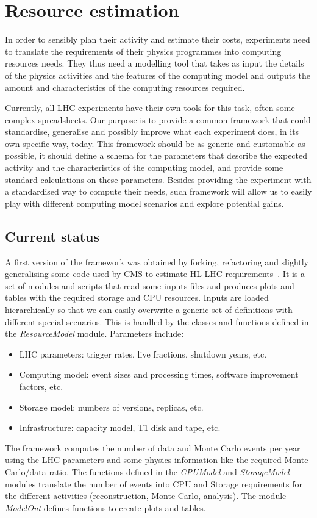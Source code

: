 \section{Resource estimation}
In order to sensibly plan their activity and estimate their costs,
experiments need to translate the requirements of their physics
programmes into computing resources needs. They thus need a modelling
tool that takes as input the details of the physics activities and the
features of the computing model and outputs the amount and
characteristics of the computing resources required.

Currently, all LHC experiments have their own tools for this task,
often some complex spreadsheets. Our purpose is to provide a common
framework that could standardise, generalise and possibly improve what
each experiment does, in its own specific way, today. This framework
should be as generic and customable as possible, it should define a
schema for the parameters that describe the expected activity and the
characteristics of the computing model, and provide some standard
calculations on these parameters.  Besides providing the experiment
with a standardised way to compute their needs, such framework will
allow us to easily play with different computing model scenarios and
explore potential gains.

\subsection{Current status}
A first version of the framework \cite{ourresmodel} was obtained by
forking, refactoring and slightly generalising some code
used by CMS to estimate HL-LHC requirements~\cite{cmsresmodel}. It is
a set of modules and scripts that read some inputs files and
produces plots and tables with the required storage and CPU
resources. Inputs are loaded hierarchically so that we can easily
overwrite a generic set of definitions with different special
scenarios. This is handled by the classes and functions defined in the
{\it ResourceModel} module. Parameters include:
\begin{itemize}
\item LHC parameters: trigger rates, live fractions, shutdown years, etc.
\item Computing model: event sizes and processing times, software improvement factors, etc.
\item Storage model: numbers of versions, replicas, etc.
\item Infrastructure: capacity model, T1 disk and tape, etc.
\end{itemize}
The framework computes the number of data and Monte Carlo events per
year using the LHC parameters and some physics information like the
required Monte Carlo/data ratio. The functions defined in the {\it
  CPUModel} and {\it StorageModel} modules translate the number of
events into CPU and Storage requirements for the different activities
(reconstruction, Monte Carlo, analysis).  The module {\it ModelOut}
defines functions to create plots and tables.


